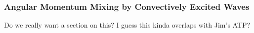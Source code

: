{\color{purple}
\subsubsection{Angular Momentum Mixing by Convectively Excited Waves}}

Do we really want a section on this?  I guess this kinda overlaps with Jim's ATP?
